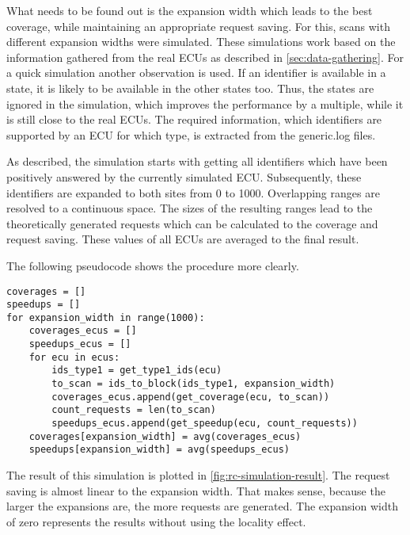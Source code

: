What needs to be found out is the expansion width which leads to the best coverage, while maintaining an appropriate request saving. For this, scans with different expansion widths were simulated. These simulations work based on the information gathered from the real ECUs as described in \autoref{sec:data-gathering}. For a quick simulation another observation is used. If an identifier is available in a state, it is likely to be available in the other states too. Thus, the states are ignored in the simulation, which improves the performance by a multiple, while it is still close to the real ECUs. The required information, which identifiers are supported by an ECU for which type, is extracted from the generic.log files.

As described, the simulation starts with getting all identifiers which have been positively answered by the currently simulated ECU. Subsequently, these identifiers are expanded to both sites from 0 to 1000. Overlapping ranges are resolved to a continuous space. The sizes of the resulting ranges lead to the theoretically generated requests which can be calculated to the coverage and request saving. These values of all ECUs are averaged to the final result.
 
The following pseudocode shows the procedure more clearly.

\begin{samepage}
\begin{verbatim}
coverages = []                                                 
speedups = []                                                  
for expansion_width in range(1000):                             
    coverages_ecus = []                                       
    speedups_ecus = []                                        
    for ecu in ecus:                                           
        ids_type1 = get_type1_ids(ecu)                         
        to_scan = ids_to_block(ids_type1, expansion_width)     
        coverages_ecus.append(get_coverage(ecu, to_scan))     
        count_requests = len(to_scan)                          
        speedups_ecus.append(get_speedup(ecu, count_requests))
    coverages[expansion_width] = avg(coverages_ecus)
    speedups[expansion_width] = avg(speedups_ecus)
\end{verbatim}
\end{samepage}

The result of this simulation is plotted in \autoref{fig:rc-simulation-result}. The request saving is almost linear to the expansion width. That makes sense, because the larger the expansions are, the more requests are generated. The expansion width of zero represents the results without using the locality effect.

